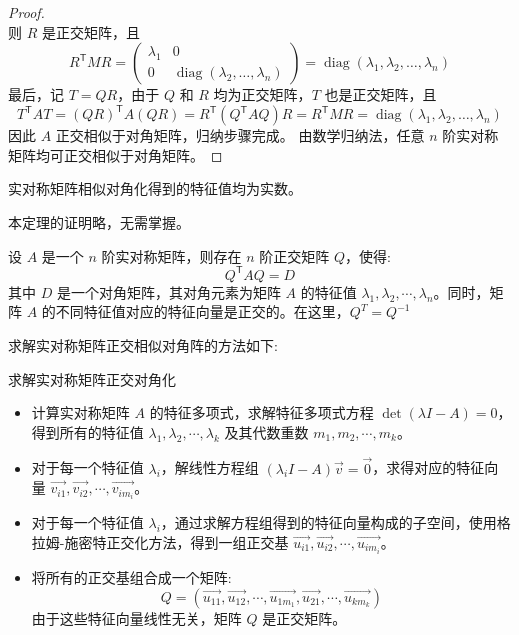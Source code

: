 \documentclass[a4paper,12pt]{ctexart}
\begin{document}
\begin{proof}
\[    \]
    则 $R$ 是正交矩阵，且
    \[
    R^{\mathsf{T}} M R = \begin{pmatrix} \lambda_1 & 0 \\ 0 & \operatorname{diag}(\lambda_2, \ldots, \lambda_n) \end{pmatrix} = \operatorname{diag}(\lambda_1, \lambda_2, \ldots, \lambda_n)
    \]
    最后，记 $T = Q R$，由于 $Q$ 和 $R$ 均为正交矩阵，$T$ 也是正交矩阵，且
    \[
    T^{\mathsf{T}} A T = (QR)^{\mathsf{T}} A (QR) = R^{\mathsf{T}} (Q^{\mathsf{T}} A Q) R = R^{\mathsf{T}} M R = \operatorname{diag}(\lambda_1, \lambda_2, \ldots, \lambda_n)
    \]
    因此 $A$ 正交相似于对角矩阵，归纳步骤完成。
    由数学归纳法，任意 $n$ 阶实对称矩阵均可正交相似于对角矩阵。
\end{proof}

\begin{mythm}{}{}
    实对称矩阵相似对角化得到的特征值均为实数。
\end{mythm}
本定理的证明略，无需掌握。

\begin{mythm}{}{}
    设 $A$ 是一个 $n$ 阶实对称矩阵，则存在 $n$ 阶正交矩阵 $Q$，使得:
    \[
    Q^{\mathsf{T}} A Q = D
    \]
    其中 $D$ 是一个对角矩阵，其对角元素为矩阵 $A$ 的特征值 $\lambda_1, \lambda_2, \cdots, \lambda_n$。同时，矩阵 $A$ 的不同特征值对应的特征向量是正交的。在这里，$Q^T= Q^{-1}$
\end{mythm}

求解实对称矩阵正交相似对角阵的方法如下:

\newpage

\begin{myalgo}{求解实对称矩阵正交对角化}{}
\begin{itemize}
    \item 计算实对称矩阵 $A$ 的特征多项式，求解特征多项式方程 $\det(\lambda I - A) = 0$，得到所有的特征值 $\lambda_1, \lambda_2, \cdots, \lambda_k$ 及其代数重数 $m_1, m_2, \cdots, m_k$。
    \item 对于每一个特征值 $\lambda_i$，解线性方程组 $(\lambda_i I - A) \vec{v} = \vec{0}$，求得对应的特征向量 $\vec{v_{i1}}, \vec{v_{i2}}, \cdots, \vec{v_{im_i}}$。
    \item 对于每一个特征值 $\lambda_i$，通过求解方程组得到的特征向量构成的子空间，使用格拉姆-施密特正交化方法，得到一组正交基 $\vec{u_{i1}}, \vec{u_{i2}}, \cdots, \vec{u_{im_i}}$。
    \item 将所有的正交基组合成一个矩阵:
    \[
    Q = (\vec{u_{11}}, \vec{u_{12}}, \cdots, \vec{u_{1m_1}}, \vec{u_{21}}, \cdots, \vec{u_{km_k}})
    \]
    由于这些特征向量线性无关，矩阵 $Q$ 是正交矩阵。
\end{itemize}
\end{myalgo}
\end{document}
